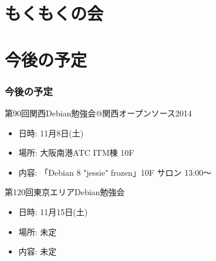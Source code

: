 \documentclass[cjk,dvipdfmx,10pt,compress,%
hyperref={bookmarks=true,bookmarksnumbered=true,bookmarksopen=false,%
colorlinks=false,%
pdftitle={第 89 回 関西 Debian 勉強会},%
pdfauthor={倉敷・のがた・佐々木・かわだ・八津尾},%
pdfsubject={資料},%
}]{beamer}
\begin{document}



\section{もくもくの会}


\section{今後の予定}
\begin{frame}[fragile]
\frametitle{今後の予定}

\begin{block}{第90回関西Debian勉強会@関西オープンソース2014}
  \begin{itemize}
  \item 日時: 11月8日(土)
  \item 場所: 大阪南港ATC ITM棟 10F
  \item 内容: 「Debian 8 "jessie" frozen」10F サロン 13:00〜
  \end{itemize}
\end{block}

\begin{block}{第120回東京エリアDebian勉強会}
  \begin{itemize}
  \item 日時: 11月15日(土)
  \item 場所: 未定
  \item 内容: 未定
  \end{itemize}
\end{block}

\end{frame}

\takahashi[50]{  }
\end{document}
